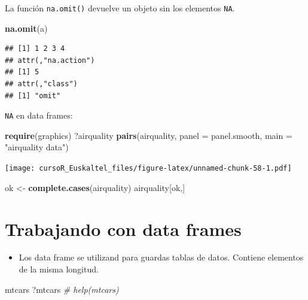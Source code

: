 \documentclass[]{book}
\newenvironment{Shaded}{\begin{snugshade}}{\end{snugshade}}
\newcommand{\KeywordTok}[1]{\textcolor[rgb]{0.13,0.29,0.53}{\textbf{#1}}}
\newcommand{\DataTypeTok}[1]{\textcolor[rgb]{0.13,0.29,0.53}{#1}}
\newcommand{\StringTok}[1]{\textcolor[rgb]{0.31,0.60,0.02}{#1}}
\newcommand{\CommentTok}[1]{\textcolor[rgb]{0.56,0.35,0.01}{\textit{#1}}}
\newcommand{\NormalTok}[1]{#1}
\providecommand{\tightlist}{%
  \setlength{\itemsep}{0pt}\setlength{\parskip}{0pt}}
\begin{document}
La función \texttt{na.omit()} devuelve un objeto sin los elementos
\texttt{NA}.

\begin{Shaded}
\begin{Highlighting}[]
\KeywordTok{na.omit}\NormalTok{(a) }
\end{Highlighting}
\end{Shaded}

\begin{verbatim}
## [1] 1 2 3 4
## attr(,"na.action")
## [1] 5
## attr(,"class")
## [1] "omit"
\end{verbatim}

\texttt{NA} en data frames:

\begin{Shaded}
\begin{Highlighting}[]
\KeywordTok{require}\NormalTok{(graphics)}
\NormalTok{?airquality}
\KeywordTok{pairs}\NormalTok{(airquality, }\DataTypeTok{panel =}\NormalTok{ panel.smooth, }\DataTypeTok{main =} \StringTok{"airquality data"}\NormalTok{)}
\end{Highlighting}
\end{Shaded}

\texttt{[image: cursoR\_Euskaltel\_files/figure-latex/unnamed-chunk-58-1.pdf]}

\begin{Shaded}
\begin{Highlighting}[]
\NormalTok{ok <-}\StringTok{ }\KeywordTok{complete.cases}\NormalTok{(airquality)}
\NormalTok{airquality[ok,]}
\end{Highlighting}
\end{Shaded}

\section{Trabajando con data frames}\label{trabajando-con-data-frames-1}

\begin{itemize}
\tightlist
\item
  Los data frame se utilizand para guardas tablas de datos. Contiene
  elementos de la misma longitud.
\end{itemize}

\begin{Shaded}
\begin{Highlighting}[]
\NormalTok{mtcars}
\NormalTok{?mtcars       }\CommentTok{# help(mtcars)}
\end{Highlighting}
\end{Shaded}
\end{document}
